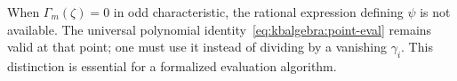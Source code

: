 \begin{remark}
When $\Gamma_m(\zeta)=0$ in odd characteristic, the rational expression defining $\psi$ is not available. The universal polynomial identity~\eqref{eq:kbalgebra:point-eval} remains valid at that point; one must use it instead of dividing by a vanishing $\gamma_i$. This distinction is essential for a formalized evaluation algorithm.
\end{remark}
